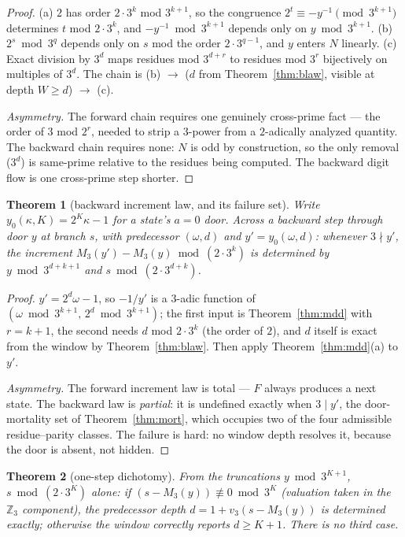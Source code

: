 \documentclass[11pt]{article}
\newtheorem{theorem}{Theorem}[section]
\theoremstyle{remark}
\newcommand{\Z}{\mathbb{Z}}
\newcommand{\vth}[1]{v_3\!\left(#1\right)}
\newcommand{\w}{\omega}
\begin{document}
\begin{proof}
(a) $2$ has order $2\cdot3^k$ mod $3^{k+1}$, so the congruence $2^t \equiv -y^{-1} \pmod{3^{k+1}}$ determines $t$ mod $2\cdot3^k$, and $-y^{-1} \bmod 3^{k+1}$ depends only on $y \bmod 3^{k+1}$. (b) $2^s \bmod 3^q$ depends only on $s$ mod the order $2\cdot3^{q-1}$, and $y$ enters $N$ linearly. (c) Exact division by $3^d$ maps residues mod $3^{d+r}$ to residues mod $3^r$ bijectively on multiples of $3^d$. The chain is (b) $\to$ ($d$ from Theorem~\ref{thm:blaw}, visible at depth $W \geq d$) $\to$ (c).

\emph{Asymmetry.} The forward chain \cite[Thm.~3.5]{paper1} requires one genuinely cross-prime fact --- the order of $3$ mod $2^r$, needed to strip a $3$-power from a $2$-adically analyzed quantity. The backward chain requires none: $N$ is odd by construction, so the only removal ($3^d$) is same-prime relative to the residues being computed. The backward digit flow is one cross-prime step shorter.
\end{proof}

\begin{theorem}[backward increment law, and its failure set]\label{thm:minc}
Write $y_0(\kappa,K) = 2^K\kappa - 1$ for a state's $a{=}0$ door. Across a backward step through door $y$ at branch $s$, with predecessor $(\w,d)$ and $y' = y_0(\w,d)$: whenever $3 \nmid y'$, the increment $M_3(y') - M_3(y) \bmod (2\cdot3^k)$ is determined by $y \bmod 3^{d+k+1}$ and $s \bmod (2\cdot 3^{d+k})$.
\end{theorem}

\begin{proof}
$y' = 2^d\w - 1$, so $-1/y'$ is a $3$-adic function of $(\w \bmod 3^{k+1},\, 2^d \bmod 3^{k+1})$; the first input is Theorem~\ref{thm:mdd} with $r = k+1$, the second needs $d$ mod $2\cdot3^k$ (the order of $2$), and $d$ itself is exact from the window by Theorem~\ref{thm:blaw}. Then apply Theorem~\ref{thm:mdd}(a) to $y'$.

\emph{Asymmetry.} The forward increment law is total --- $F$ always produces a next state. The backward law is \emph{partial}: it is undefined exactly when $3 \mid y'$, the door-mortality set of Theorem~\ref{thm:mort}, which occupies two of the four admissible residue--parity classes. The failure is hard: no window depth resolves it, because the door is absent, not hidden.
\end{proof}

\begin{theorem}[one-step dichotomy]\label{thm:dich}
From the truncations $y \bmod 3^{K+1}$, $s \bmod (2\cdot3^K)$ alone: if $(s - M_3(y)) \not\equiv 0 \bmod 3^K$ (valuation taken in the $\Z_3$ component), the predecessor depth $d = 1 + \vth{s - M_3(y)}$ is determined exactly; otherwise the window correctly reports $d \ge K + 1$. There is no third case.
\end{theorem}
\end{document}
